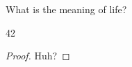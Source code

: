 \documentclass[12pt]{problem-set}
\author{Cooper Simpson}
\date{\today}
\begin{document}
	
	\maketitle
	
	\begin{problem}{1}
		\begin{question}
			What is the meaning of life?
		\end{question}
		
		\begin{solution}
			\begin{work}
				42
			\end{work}
			
			\begin{proof}
				Huh?
			\end{proof}
		\end{solution}
	\end{problem}
	
	
\end{document}
